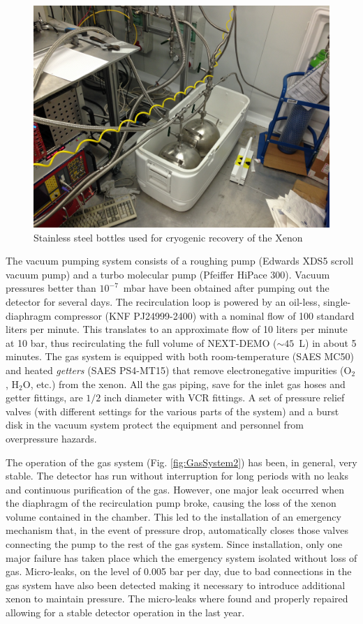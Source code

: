 \begin{figure}[tbh]
\centering
\includegraphics[width=\textwidth]{img/recoverybottle.jpg}
\caption{Stainless steel bottles used for cryogenic recovery of the Xenon} \label{fig:RecoB}
\end{figure}



The vacuum pumping system consists of a roughing pump (Edwards XDS5 scroll vacuum pump) and a turbo molecular pump (Pfeiffer HiPace 300). Vacuum pressures better than $10^{-7}$~mbar have been obtained after pumping out the detector for several days. The recirculation loop is powered by an oil-less, single-diaphragm compressor (KNF PJ24999-2400) with a nominal flow of 100 standard liters per minute. This translates to 
an approximate flow of 10 liters per minute at 10 bar, thus recirculating the full volume of NEXT-DEMO ($\sim45$~L) in about 5 minutes. The gas system is equipped with both room-temperature (SAES MC50) and heated \emph{getters} (SAES PS4-MT15) that remove electronegative impurities (O$_{2}$, H$_{2}$O, etc.) from the xenon. All the gas piping, save for the inlet gas hoses and getter fittings, are $1/2$ inch diameter with VCR fittings. A set of pressure relief valves (with different settings for the various parts of the system) and a burst disk in the vacuum system protect the equipment and personnel from overpressure hazards.

The operation of the gas system (Fig. \ref{fig:GasSystem2}) has been, in general, very stable. The detector has run without interruption for long periods with no leaks and continuous purification of the gas. However, one major leak occurred when the diaphragm of the recirculation pump broke, causing the loss of the xenon volume contained in the chamber. This led to the installation of an emergency mechanism that, in the event of pressure drop, automatically closes those valves connecting the pump to the rest of the gas system. Since installation, only one major failure has taken place which the emergency system isolated without loss of gas.  Micro-leaks, on the level of 0.005 bar per day, due to bad connections in the gas system have also been detected making it necessary to introduce additional xenon to maintain pressure. The micro-leaks where found and properly repaired allowing for a stable detector operation in the last year.

